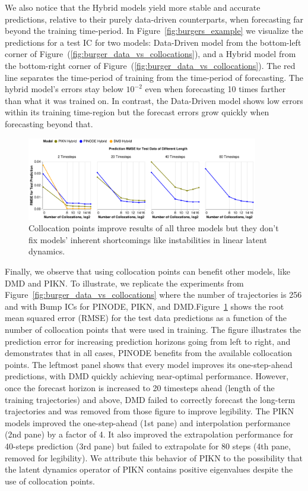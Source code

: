 We also notice that the Hybrid models yield more stable and accurate predictions, relative to their purely data-driven counterparts, when forecasting far beyond the training time-period. In Figure~\ref{fig:burgers_example} we visualize the predictions for a test IC for two models: Data-Driven model from the bottom-left corner of Figure~(\ref{fig:burger_data_vs_collocations}), and a Hybrid model from the bottom-right corner of Figure~(\ref{fig:burger_data_vs_collocations}). The red line separates the time-period of training from the time-period of forecasting. The hybrid model's errors stay below $10^{-2}$ even when forecasting 10 times farther than what it was trained on. In contrast, the Data-Driven model shows low errors within its training time-region but the forecast errors grow quickly when forecasting beyond that.

\begin{figure}[ht]
    \centering
    \includegraphics[width=0.9\textwidth]{figures/burgers_collocations_rmse.pdf}
    \caption{Collocation points improve results of all three models but they don't fix models' inherent shortcomings like instabilities in linear latent dynamics.\label{fig:burgers_collocations_rmse}}
\end{figure}

Finally, we observe that using collocation points can benefit other models, like DMD and PIKN. To illustrate, we replicate the experiments from Figure~\ref{fig:burger_data_vs_collocations} where the number of trajectories is 256 and with Bump ICs for PINODE, PIKN, and DMD.Figure~\ref{fig:burgers_collocations_rmse} shows the root mean squared error (RMSE) for the test data predictions as a function of the number of collocation points that were used in training.  The figure illustrates the prediction error for increasing prediction horizons going from left to right, and demonstrates that in all cases, PINODE benefits from the available collocation points. The leftmost panel shows that every model improves its one-step-ahead predictions, with DMD quickly achieving near-optimal performance. However, once the forecast horizon is increased to 20 timesteps ahead (length of the training trajectories) and above, DMD failed to correctly forecast the long-term trajectories and was removed from those figure to improve legibility. The PIKN models improved the one-step-ahead (1st pane) and interpolation performance (2nd pane) by a factor of 4. It also improved the extrapolation performance for 40-steps prediction (3rd pane) but failed to extrapolate for 80 steps (4th pane, removed for legibility). We attribute this behavior of PIKN to the possibility that the latent dynamics operator of PIKN contains positive eigenvalues despite the use of collocation points.

